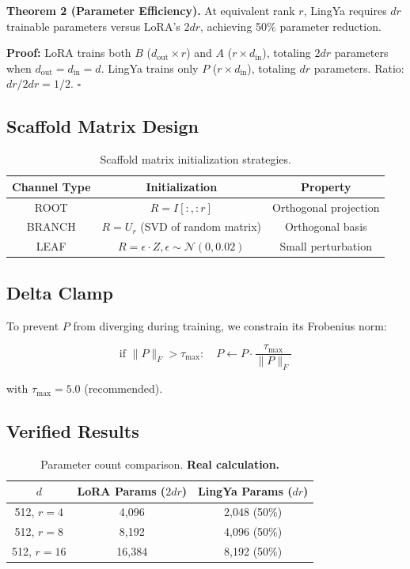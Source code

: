 \documentclass[11pt]{article}
\begin{document}
\textbf{Theorem 2 (Parameter Efficiency).} At equivalent rank $r$, LingYa requires $dr$ trainable parameters versus LoRA's $2dr$, achieving 50\% parameter reduction.

\textbf{Proof:} LoRA trains both $B$ ($d_{\text{out}} \times r$) and $A$ ($r \times d_{\text{in}}$), totaling $2dr$ parameters when $d_{\text{out}} = d_{\text{in}} = d$. LingYa trains only $P$ ($r \times d_{\text{in}}$), totaling $dr$ parameters. Ratio: $dr / 2dr = 1/2$. $\square$

\subsection{Scaffold Matrix Design}

\begin{table}[h]
\centering
\begin{tabular}{ccc}
\toprule
Channel Type & Initialization & Property \\
\midrule
ROOT & $R = I[:, :r]$ & Orthogonal projection \\
BRANCH & $R = U_r$ (SVD of random matrix) & Orthogonal basis \\
LEAF & $R = \epsilon \cdot Z, \epsilon \sim \mathcal{N}(0, 0.02)$ & Small perturbation \\
\bottomrule
\end{tabular}
\caption{Scaffold matrix initialization strategies.}
\end{table}

\subsection{Delta Clamp}

To prevent $P$ from diverging during training, we constrain its Frobenius norm:

\begin{equation}
\text{if } \|P\|_F > \tau_{\text{max}}: \quad P \leftarrow P \cdot \frac{\tau_{\text{max}}}{\|P\|_F}
\end{equation}

with $\tau_{\text{max}} = 5.0$ (recommended).

\subsection{Verified Results}

\begin{table}[h]
\centering
\begin{tabular}{ccc}
\toprule
$d$ & LoRA Params ($2dr$) & LingYa Params ($dr$) \\
\midrule
512, $r=4$ & 4,096 & 2,048 (50\%) \\
512, $r=8$ & 8,192 & 4,096 (50\%) \\
512, $r=16$ & 16,384 & 8,192 (50\%) \\
\bottomrule
\end{tabular}
\caption{Parameter count comparison. \textbf{Real calculation.}}
\end{table}
\end{document}
